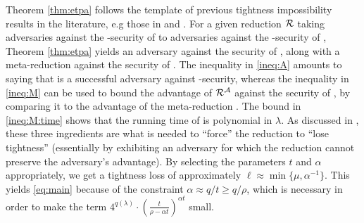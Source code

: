 Theorem \ref{thm:etpa} follows the template of previous tightness
impossibility results in the literature, e.g those in  and .
For a given reduction \(\redR\)
taking adversaries against the \ETPA-security of \TP to
adversaries against the \SICA-security of \Simple,
Theorem \ref{thm:etpa}
yields an adversary \advA against the \ETPA security of \TP,
along with a meta-reduction \redM against the \SICA security of \Simple.
The inequality in \eqref{ineq:A}
amounts to saying that \advA is a successful adversary against \ETPA-security,
whereas the inequality in \eqref{ineq:M} can be used to bound the advantage of \(\redR^{\advA}\)
against the \SICA security of \Simple,
by comparing it to the advantage of the meta-reduction \redM.
The bound in \eqref{ineq:M:time} shows that the running time of \redM is polynomial in \(\lambda\).
As discussed in , these three ingredients are what
is needed to ``force'' the reduction \redR to ``lose tightness''
(essentially by exhibiting an adversary for which the reduction cannot preserve the adversary's advantage).
By selecting the parameters  \(t\) and \(\alpha\) appropriately,
we get a tightness loss of approximately \(\ell \approx \min \{ \mu, \alpha^{-1}\}\).
This yields \eqref{eq:main} because of the constraint \(\alpha \approx q / t \ge q / \rho\),
which is necessary in order to make the term
\(4^{q(\lambda)} \cdot \left( \frac{t}{\rho - \alpha t} \right)^{\alpha t}\)
small.

